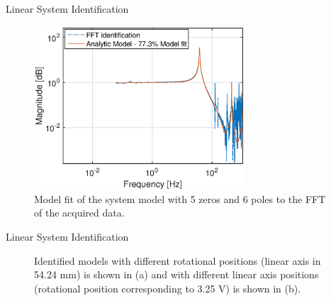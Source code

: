 \documentclass[10pt]{beamer}
\begin{document}
\begin{frame}{Linear System Identification}
  \begin{figure}[h!]
    \centering
    \includegraphics[width=0.7\textwidth]{../fig/matlab/model.eps}
    \caption{\label{fig:model} Model fit of the system model with 5 zeros and 6 poles to the FFT of the acquired data.}
  \end{figure}
\end{frame}

\begin{frame}{Linear System Identification}
  \begin{figure}[h]
    \centering %
    \qquad
    \caption{\label{fig:different_lin_angle} Identified models with different rotational positions (linear axis in 54.24 mm) is shown in (a) and with different linear axis positions (rotational position corresponding to 3.25 V) is shown in (b).}
  \end{figure}
\end{frame}
\end{document}
